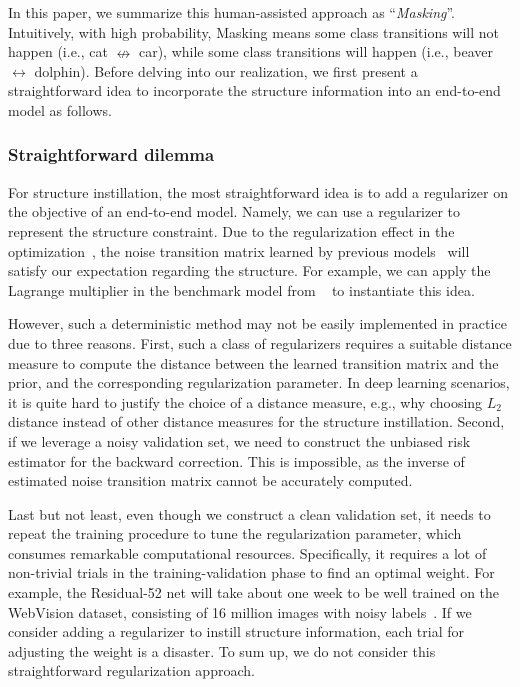 \documentclass{article}
\begin{document}
In this paper, we summarize this human-assisted approach as ``\textit{Masking}''. Intuitively, with high probability, Masking means some class transitions will not happen (i.e., cat $\nleftrightarrow$ car), while some class transitions will happen (i.e., beaver $\leftrightarrow$ dolphin). Before delving into our realization, we first present a straightforward idea to incorporate the structure information into an end-to-end model as follows.

\subsubsection{Straightforward dilemma}\label{straightforward-dilemma}
For structure instillation, the most straightforward idea is to add a regularizer on the objective of an end-to-end model. Namely, we can use a regularizer to represent the structure constraint. Due to the regularization effect in the optimization~\cite{Goodfellow-et-al-2016}, the noise transition matrix learned by previous models~\cite{patrini2017making,goldberger2016training} will satisfy our expectation regarding the structure. For example, we can apply the Lagrange multiplier in the benchmark model from ~\cite{goldberger2016training} to instantiate this idea.

However, such a deterministic method may not be easily implemented in practice due to three reasons. First, such a class of regularizers requires a suitable distance measure to compute the distance between the learned transition matrix and the prior, and the corresponding regularization parameter. In deep learning scenarios, it is quite hard to justify the choice of a distance measure, e.g., why choosing $L_2$ distance instead of other distance measures for the structure instillation. Second, if we leverage a noisy validation set, we need to construct the unbiased risk estimator for the backward correction. This is impossible, as the inverse of estimated noise transition matrix cannot be accurately computed.

Last but not least, even though we construct a clean validation set, it needs to repeat the training procedure to tune the regularization parameter, which consumes remarkable computational resources. Specifically, it requires a lot of non-trivial trials in the training-validation phase to find an optimal weight. For example, the Residual-52 net will take about one week to be well trained on the WebVision dataset, consisting of 16 million images with noisy labels~\cite{webvision}. If we consider adding a regularizer to instill structure information, each trial for adjusting the weight is a disaster. To sum up, we do not consider this straightforward regularization approach.
\end{document}
